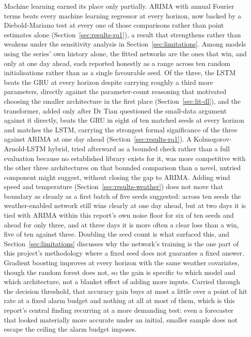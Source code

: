 \documentclass[12pt,a4paper]{report}
\begin{document}
Machine learning earned its place only partially. ARIMA with annual Fourier
terms beats every machine learning regressor at every horizon, now backed by
a Diebold-Mariano test at every one of those comparisons rather than point
estimates alone (Section~\ref{sec:results-rq1}), a result that strengthens
rather than weakens under the sensitivity analysis in
Section~\ref{sec:limitations}. Among models using the series' own history
alone, the fitted networks are the ones that win, and only at one day
ahead, each reported honestly as a range across ten random initialisations
rather than as a single favourable seed. Of the three, the LSTM beats the
GRU at every horizon despite carrying roughly a third more parameters,
directly against the parameter-count reasoning that motivated choosing
the smaller architecture in the first place (Section~\ref{sec:lit-dl}),
and the transformer, added only after Dr Tian questioned the small-data
argument against it directly, beats the GRU in eight of ten matched seeds
at every horizon and matches the LSTM, carrying the strongest formal
significance of the three against ARIMA at one day ahead
(Section~\ref{sec:results-rq1}). A Kolmogorov-Arnold-LSTM hybrid, tried
afterward as a bounded check rather than a full evaluation because no
established library exists for it, was more competitive with the other
three architectures on that bounded comparison than a novel, untried
component might suggest, without closing the gap to ARIMA. Adding wind speed and temperature
(Section~\ref{sec:results-weather}) does not move that boundary as cleanly
as a first batch of five seeds suggested: across ten seeds the
weather-enabled network still wins clearly at one day ahead, but at two
days it is tied with ARIMA within this report's own noise floor for six of
ten seeds and ahead for only three, and at three days it is more often a
clear loss than a win, five of ten against three. Doubling the seed count
is what surfaced this, and Section~\ref{sec:limitations} discusses why the
network's training is the one part of this project's methodology where a
fixed seed does not guarantee a fixed answer. Gradient boosting improves at
every horizon with the same weather covariates, though the random forest
does not, so the gain is specific to which model and which architecture,
not a blanket effect of adding more inputs. Carried through the decision
threshold, that accuracy gain buys at most a little over a point of hit
rate at a fixed alarm budget and nothing at all at most of them, which is
this report's central finding recurring at a more demanding test: even a
forecaster that looked materially more accurate under an initial, smaller
sample does not escape the ceiling the alarm budget imposes.
\end{document}
